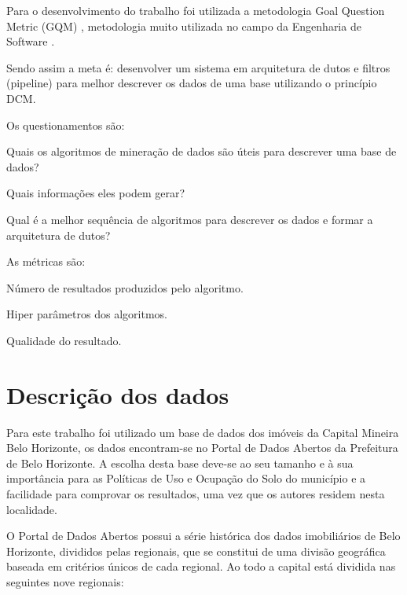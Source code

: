 \documentclass[12pt]{article}
\begin{document}
Para o desenvolvimento do trabalho foi utilizada a metodologia Goal Question Metric (GQM) \cite{caldiera1994goal}, metodologia muito utilizada no campo da Engenharia de Software \cite{sommerville2011software}. 

Sendo assim a meta é: desenvolver um sistema em arquitetura de dutos e filtros (pipeline) para melhor descrever os dados de uma base utilizando o princípio DCM. 

Os questionamentos são:
\begin{questions}
        \item Quais os algoritmos de mineração de dados são úteis para descrever uma base de dados?
        \item Quais informações eles podem gerar?
        \item Qual é a melhor sequência de algoritmos para descrever os dados e formar a arquitetura de dutos?
\end{questions}

As métricas são: 
\begin{metrics}
        \item Número de resultados produzidos pelo algoritmo.
        \item Hiper parâmetros dos algoritmos.
        \item Qualidade do resultado.
\end{metrics}
\section{Descrição dos dados}
Para este trabalho foi utilizado um base de dados dos imóveis da Capital Mineira Belo Horizonte, os dados encontram-se no Portal de Dados Abertos da Prefeitura de Belo Horizonte. A escolha desta base deve-se ao seu tamanho e à sua importância para as Políticas de Uso e Ocupação do Solo do município e a facilidade para comprovar os resultados, uma vez que os autores residem nesta localidade. 

O Portal de Dados Abertos possui a série histórica dos dados imobiliários de Belo Horizonte, divididos pelas regionais, que se constitui de uma divisão geográfica baseada em critérios únicos de cada regional. Ao todo a capital está dividida nas seguintes nove regionais:
\end{document}
